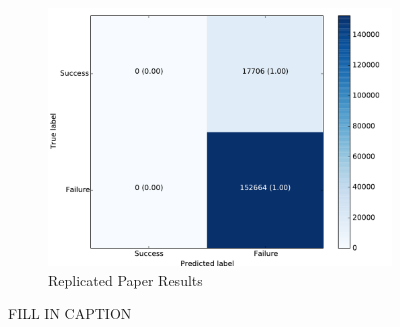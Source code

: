 \begin{figure}[t!]
\begin{subfigure}[t]{0.24\textwidth}
        \end{subfigure}
    \begin{subfigure}[t]{0.24\textwidth}
        \includegraphics[width=0.9\columnwidth]{figs/paper_original.pdf} \caption{Replicated Paper Results} \label{fig:from_paper}
    \end{subfigure}
\caption{FILL IN CAPTION} \label{fig:confusion_matrices}
\end{figure}